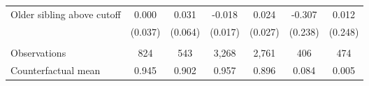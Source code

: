 {{\begin{tabular}{lcccccc}
Older sibling above cutoff&       0.000   &       0.031   &      -0.018   &       0.024   &      -0.307   &       0.012   \\
                    &     (0.037)   &     (0.064)   &     (0.017)   &     (0.027)   &     (0.238)   &     (0.248)   \\
                    &               &               &               &               &               &               \\
Observations        &         824   &         543   &       3,268   &       2,761   &         406   &         474   \\
Counterfactual mean &       0.945   &       0.902   &       0.957   &       0.896   &       0.084   &       0.005   \\
 

\bottomrule
\end{tabular}
}
}
